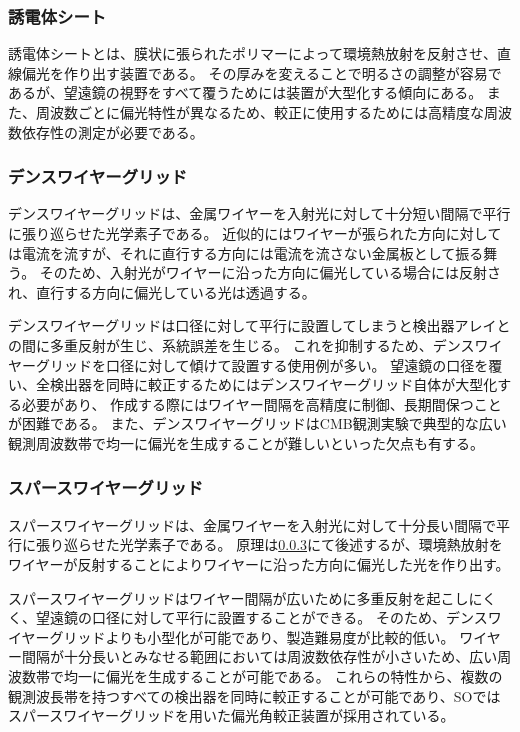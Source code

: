 \documentclass[../../main.tex]{subfiles}
\begin{document}
\subsubsection{誘電体シート}
誘電体シートとは、膜状に張られたポリマーによって環境熱放射を反射させ、直線偏光を作り出す装置である。
その厚みを変えることで明るさの調整が容易であるが、望遠鏡の視野をすべて覆うためには装置が大型化する傾向にある。
また、周波数ごとに偏光特性が異なるため、較正に使用するためには高精度な周波数依存性の測定が必要である。

\subsubsection{デンスワイヤーグリッド}
デンスワイヤーグリッドは、金属ワイヤーを入射光に対して十分短い間隔で平行に張り巡らせた光学素子である。
近似的にはワイヤーが張られた方向に対しては電流を流すが、それに直行する方向には電流を流さない金属板として振る舞う。
そのため、入射光がワイヤーに沿った方向に偏光している場合には反射され、直行する方向に偏光している光は透過する。

デンスワイヤーグリッドは口径に対して平行に設置してしまうと検出器アレイとの間に多重反射が生じ、系統誤差を生じる。
これを抑制するため、デンスワイヤーグリッドを口径に対して傾けて設置する使用例が多い。
望遠鏡の口径を覆い、全検出器を同時に較正するためにはデンスワイヤーグリッド自体が大型化する必要があり、
作成する際にはワイヤー間隔を高精度に制御、長期間保つことが困難である。
また、デンスワイヤーグリッドはCMB観測実験で典型的な広い観測周波数帯で均一に偏光を生成することが難しいといった欠点も有する。

\subsubsection{スパースワイヤーグリッド}
スパースワイヤーグリッドは、金属ワイヤーを入射光に対して十分長い間隔で平行に張り巡らせた光学素子である。
原理は\ref{}にて後述するが、環境熱放射をワイヤーが反射することによりワイヤーに沿った方向に偏光した光を作り出す。

スパースワイヤーグリッドはワイヤー間隔が広いために多重反射を起こしにくく、望遠鏡の口径に対して平行に設置することができる。
そのため、デンスワイヤーグリッドよりも小型化が可能であり、製造難易度が比較的低い。
ワイヤー間隔が十分長いとみなせる範囲においては周波数依存性が小さいため、広い周波数帯で均一に偏光を生成することが可能である。
これらの特性から、複数の観測波長帯を持つすべての検出器を同時に較正することが可能であり、SOではスパースワイヤーグリッドを用いた偏光角較正装置が採用されている。
\end{document}
